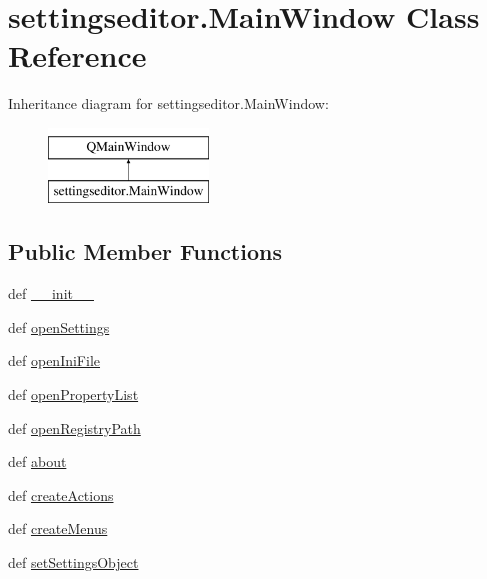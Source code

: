 \hypertarget{classsettingseditor_1_1MainWindow}{}\section{settingseditor.\+Main\+Window Class Reference}
\label{classsettingseditor_1_1MainWindow}
Inheritance diagram for settingseditor.\+Main\+Window\+:\begin{figure}[H]
\begin{center}
\leavevmode
\includegraphics[height=2.000000cm]{classsettingseditor_1_1MainWindow}
\end{center}
\end{figure}
\subsection*{Public Member Functions}
\begin{DoxyCompactItemize}
\item 
def \hyperlink{classsettingseditor_1_1MainWindow_ad709a34c53d37614534fd2cde5de468a}{\+\_\+\+\_\+init\+\_\+\+\_\+}
\item 
def \hyperlink{classsettingseditor_1_1MainWindow_aa772f82d4f1b862037109ae4bf2ad816}{open\+Settings}
\item 
def \hyperlink{classsettingseditor_1_1MainWindow_a53cff309d82de93727ecaf1ab1593985}{open\+Ini\+File}
\item 
def \hyperlink{classsettingseditor_1_1MainWindow_ad7a9f21b82b2f2f2b30dad815c2fda65}{open\+Property\+List}
\item 
def \hyperlink{classsettingseditor_1_1MainWindow_a42744d990ae497312aee6cc1461663fc}{open\+Registry\+Path}
\item 
def \hyperlink{classsettingseditor_1_1MainWindow_af81352d969024005f3b28f85faa8fe94}{about}
\item 
def \hyperlink{classsettingseditor_1_1MainWindow_a44715819004b1873db0f5f48bb3d7b63}{create\+Actions}
\item 
def \hyperlink{classsettingseditor_1_1MainWindow_a136847646f9f51a6ec3d7295b9db5fa4}{create\+Menus}
\item 
def \hyperlink{classsettingseditor_1_1MainWindow_ad0e833ee567739ca6acd0d6e0259ce1b}{set\+Settings\+Object}
\end{DoxyCompactItemize}
